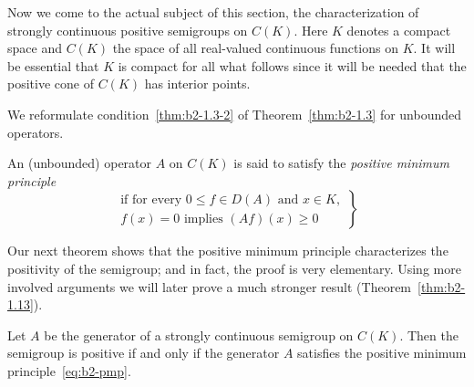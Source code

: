 Now we come to the actual subject of this section, the characterization of strongly continuous positive semigroups on $C(K)$.
Here $K$ denotes a compact space and $C(K)$ the space of all real-valued continuous functions on $K$.
It will be essential that $K$ is compact for all what follows since it will be needed that the positive cone of\/ $C(K)$ has interior points.

We reformulate condition~\ref{thm:b2-1.3-2} of Theorem~\ref{thm:b2-1.3} for unbounded operators.
\begin{definition}\label{def:b2-1.5}
An (unbounded) operator $A$ on $C(K)$ is said to satisfy the \emph{positive minimum principle}  
\begin{equation*}\label{eq:b2-pmp} \tag{P}
\left.
\begin{aligned}
    \text{if for every } 0 \leq f \in D(A) \text{ and } x \in K,\\
    f(x) = 0 \text{ implies } (Af)(x) \geq 0
\end{aligned} 
\right\}   
\end{equation*}
\end{definition}
Our next theorem shows that the positive minimum principle characterizes the positivity of the semigroup; and in fact, the proof is very elementary.
Using more involved arguments we will later prove a much stronger result (Theorem~\ref{thm:b2-1.13}).
\begin{theorem}\label{thm:b2-1.6}
Let $A$ be the generator of a strongly continuous semigroup on $C(K)$.
Then the semigroup is positive if and only if the generator $A$ satisfies the positive minimum principle~\eqref{eq:b2-pmp}.
\end{theorem}
